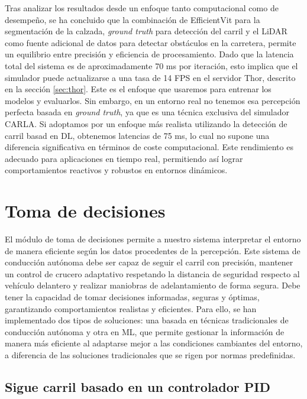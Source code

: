 Tras analizar los resultados desde un enfoque tanto computacional como de desempeño, se ha concluido que la combinación de EfficientVit para la segmentación de la calzada, \textit{ground truth} para detección del carril y el \ac{LiDAR} como fuente adicional de datos para detectar obstáculos en la carretera, permite un equilibrio entre precisión y eficiencia de procesamiento. Dado que la latencia total del sistema es de aproximadamente 70 ms por iteración, esto implica que el simulador puede actualizarse a una tasa de \ac{14 FPS} en el servidor Thor, descrito en la sección \ref{sec:thor}. Este es el enfoque que usaremos para entrenar los modelos y evaluarlos. Sin embargo, en un entorno real no tenemos esa percepción perfecta basada en \textit{ground truth}, ya que es una técnica exclusiva del simulador CARLA. Si adoptamos por un enfoque más realista utilizando la detección de carril basad en \ac{DL}, obtenemos latencias de 75 ms, lo cual no supone una diferencia significativa en términos de coste computacional. Este rendimiento es adecuado para aplicaciones en tiempo real, permitiendo así lograr comportamientos reactivos y robustos en entornos dinámicos.

\section{Toma de decisiones}

El módulo de toma de decisiones permite a nuestro sistema interpretar el entorno de manera eficiente según los datos procedentes de la percepción. Este sistema de conducción autónoma debe ser capaz de seguir el carril con precisión, mantener un control de crucero adaptativo respetando la distancia de seguridad respecto al vehículo delantero y realizar maniobras de adelantamiento de forma segura. Debe tener la capacidad de tomar decisiones informadas, seguras y óptimas, garantizando comportamientos realistas y eficientes. Para ello, se han implementado dos tipos de soluciones: una basada en técnicas tradicionales de conducción autónoma y otra en \ac{ML}, que permite gestionar la información de manera más eficiente al adaptarse mejor a las condiciones cambiantes del entorno, a diferencia de las soluciones tradicionales que se rigen por normas predefinidas.

\subsection{Sigue carril basado en un controlador PID}

